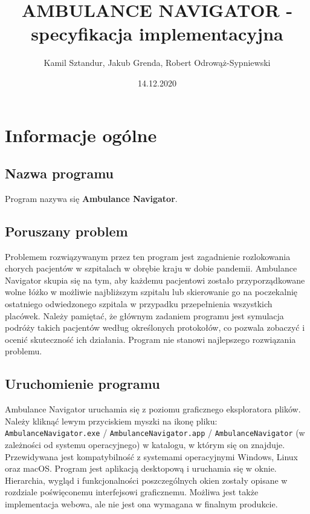 \documentclass{article}
\title{\textbf{AMBULANCE NAVIGATOR - specyfikacja implementacyjna}}
\author{Kamil Sztandur, Jakub Grenda, Robert Odrowąż-Sypniewski}
\date{14.12.2020}
\newcommand\tab[1][1cm]{\hspace*{#1}}
\begin{document}
\begin{tcolorbox}
\maketitle
\end{tcolorbox}
\newpage

\section{Informacje ogólne}
\subsection{Nazwa programu}
\tab Program nazywa się \textbf{Ambulance Navigator}.

\subsection{Poruszany problem}
\tab Problemem rozwiązywanym przez ten program jest zagadnienie rozlokowania chorych pacjentów w szpitalach w obrębie kraju w dobie pandemii. Ambulance Navigator skupia się na tym, aby każdemu pacjentowi zostało przyporządkowane wolne łóżko w możliwie najbliższym szpitalu lub skierowanie go na poczekalnię ostatniego odwiedzonego szpitala w przypadku przepełnienia wszystkich placówek.
\newline \tab Należy pamiętać, że głównym zadaniem programu jest symulacja podróży takich pacjentów według określonych protokołów, co pozwala zobaczyć i ocenić skuteczność ich działania. Program nie stanowi najlepszego rozwiązania problemu.

\subsection{Uruchomienie programu}
\tab Ambulance Navigator uruchamia się z poziomu graficznego eksploratora plików. Należy kliknąć lewym przyciskiem myszki na ikonę pliku:
\texttt{AmbulanceNavigator.exe} / \texttt{AmbulanceNavigator.app} / \texttt{AmbulanceNavigator}
(w zależności od systemu operacyjnego) w katalogu, w którym się on znajduje. Przewidywana jest kompatybilność z systemami operacyjnymi Windows, Linux oraz macOS.
\newline \tab Program jest aplikacją desktopową i uruchamia się w oknie. Hierarchia, wygląd i funkcjonalności poszczególnych okien zostały opisane w rozdziale poświęconemu interfejsowi graficznemu. Możliwa jest także implementacja webowa, ale nie jest ona wymagana w finalnym produkcie.
\end{document}
